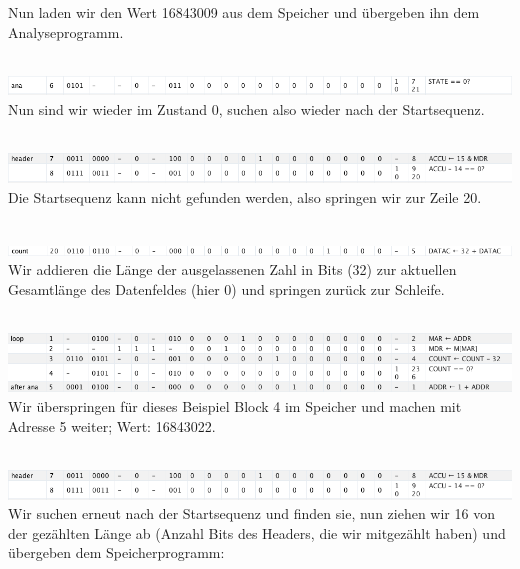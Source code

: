 \documentclass[12pt,titlepage]{article}
\begin{document}
Nun laden wir den Wert 16843009 aus dem Speicher und übergeben ihn dem Analyseprogramm.

\leavevmode \\
\includegraphics[width=16cm]{listing/row6.png}
\leavevmode \\

Nun sind wir wieder im Zustand 0, suchen also wieder nach der Startsequenz.

\leavevmode \\
\includegraphics[width=16cm]{listing/row7-8.png}
\leavevmode \\

Die Startsequenz kann nicht gefunden werden, also springen wir zur Zeile 20.

\leavevmode \\
\includegraphics[width=16cm]{listing/row20.png}
\leavevmode \\

Wir addieren die Länge der ausgelassenen Zahl in Bits (32) zur aktuellen Gesamtlänge des Datenfeldes (hier 0) und
springen zurück zur Schleife.

\leavevmode \\
\includegraphics[width=16cm]{listing/row1-5.png}
\leavevmode \\

Wir überspringen für dieses Beispiel Block 4 im Speicher und machen mit Adresse 5 weiter; Wert: 16843022.

\leavevmode \\
\includegraphics[width=16cm]{listing/row7-8.png}
\leavevmode \\

Wir suchen erneut nach der Startsequenz und finden sie, nun ziehen wir 16 von der gezählten Länge ab (Anzahl Bits des Headers, die wir
mitgezählt haben) und übergeben dem Speicherprogramm:
\end{document}
